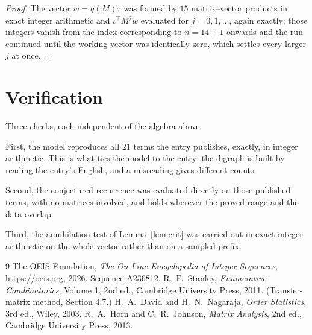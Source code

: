 \documentclass[11pt,a4paper]{article}
\theoremstyle{plain}
\theoremstyle{definition}
\begin{document}
\begin{proof}
The vector $w=q(M)\tau$ was formed by $15$ matrix--vector products in exact integer
arithmetic and $\iota^{\!\top}M^{j}w$ evaluated for $j=0,1,\dots$, again exactly; those
integers vanish from the index corresponding to $n=14+1$ onwards and the run continued
until the working vector was identically zero, which settles every larger $j$ at once.
\end{proof}

\section{Verification}

Three checks, each independent of the algebra above.

First, the model reproduces all $21$ terms the entry publishes, exactly, in integer
arithmetic. This is what ties the model to the entry: the digraph is built by reading the
entry's English, and a misreading gives different counts.

Second, the conjectured recurrence was evaluated directly on those published terms, with no
matrices involved, and holds wherever the proved range and the data overlap.

Third, the annihilation test of Lemma~\ref{lem:crit} was carried out in exact integer
arithmetic on the whole vector rather than on a sampled prefix.

\begin{thebibliography}{9}
 The OEIS Foundation, \emph{The On-Line Encyclopedia of Integer
Sequences}, \url{https://oeis.org}, 2026. Sequence A236812.
 R.~P.~Stanley, \emph{Enumerative Combinatorics}, Volume 1, 2nd ed.,
Cambridge University Press, 2011. (Transfer-matrix method, Section 4.7.)
 H.~A.~David and H.~N.~Nagaraja, \emph{Order Statistics}, 3rd ed., Wiley,
2003.
 R.~A.~Horn and C.~R.~Johnson, \emph{Matrix Analysis}, 2nd ed., Cambridge
University Press, 2013.
\end{thebibliography}
\end{document}

